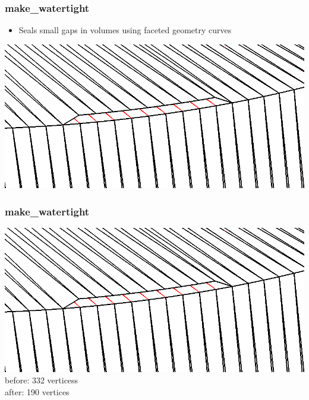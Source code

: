 \documentclass[14pt]{beamer}
\begin{document}
\begin{frame}
\frametitle{make\_watertight}
\begin{itemize}
\item Seals small gaps in volumes using faceted geometry curves
\end{itemize}
\begin{center}
\includegraphics[scale=0.25, trim = 0 200 0 0 ]{cyl_loop_close.png}

\end{center}

\end{frame}


\begin{frame}
\frametitle{make\_watertight}

\begin{center}


\includegraphics[scale=0.25, trim = 0 0 0 0 ]{cyl_loop_close.png}
\vfill 
before: 332 verticess \\ after: 190 vertices
\end{center}
\end{frame}
\end{document}
